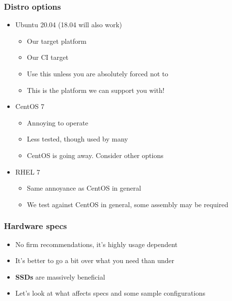 \begin{frame}
    \frametitle{Distro options}
        \begin{itemize}
            \item Ubuntu 20.04 (18.04 will also work)
            \begin{itemize}
                \item Our target platform
                \item Our CI target
                \item Use this unless you are absolutely forced not to
                \item This is the platform we can support you with!
            \end{itemize}
            \item CentOS 7
            \begin{itemize}
                \item Annoying to operate
                \item Less tested, though used by many
                \item CentOS is going away. Consider other options
            \end{itemize}
            \item RHEL 7
            \begin{itemize}
                \item Same annoyance as CentOS in general
                \item We test against CentOS in general, some assembly may be required
            \end{itemize}
        \end{itemize}
\end{frame}

\begin{frame}
\frametitle{Hardware specs}
    \begin{itemize}
        \item No firm recommendations, it's highly usage dependent
        \item It's better to go a bit over what you need than under
        \item {\bf SSDs} are massively beneficial
        \item Let's look at what affects specs and some sample configurations
    \end{itemize}
\end{frame}

